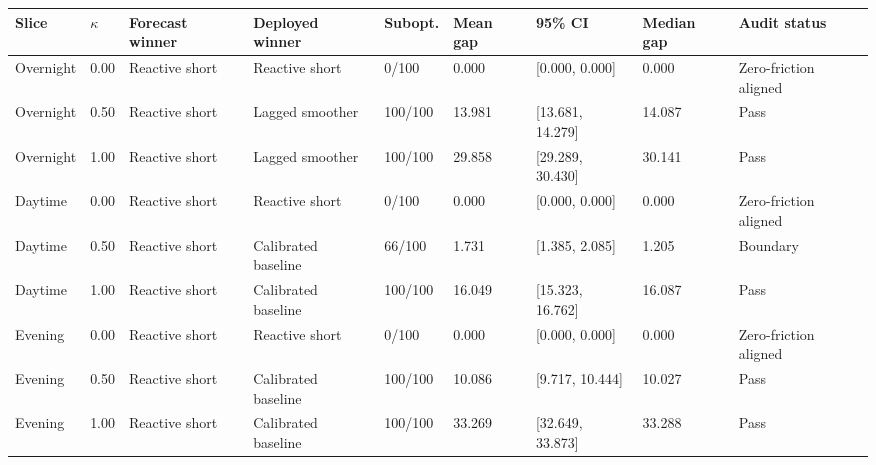 \begin{tabular}{lllllllll}
\toprule
Slice & \(\kappa\) & Forecast winner & Deployed winner & Subopt. & Mean gap & 95\% CI & Median gap & Audit status \\
\midrule
Overnight & 0.00 & Reactive short & Reactive short & 0/100 & 0.000 & [0.000, 0.000] & 0.000 & Zero-friction aligned \\
Overnight & 0.50 & Reactive short & Lagged smoother & 100/100 & 13.981 & [13.681, 14.279] & 14.087 & Pass \\
Overnight & 1.00 & Reactive short & Lagged smoother & 100/100 & 29.858 & [29.289, 30.430] & 30.141 & Pass \\
Daytime & 0.00 & Reactive short & Reactive short & 0/100 & 0.000 & [0.000, 0.000] & 0.000 & Zero-friction aligned \\
Daytime & 0.50 & Reactive short & Calibrated baseline & 66/100 & 1.731 & [1.385, 2.085] & 1.205 & Boundary \\
Daytime & 1.00 & Reactive short & Calibrated baseline & 100/100 & 16.049 & [15.323, 16.762] & 16.087 & Pass \\
Evening & 0.00 & Reactive short & Reactive short & 0/100 & 0.000 & [0.000, 0.000] & 0.000 & Zero-friction aligned \\
Evening & 0.50 & Reactive short & Calibrated baseline & 100/100 & 10.086 & [9.717, 10.444] & 10.027 & Pass \\
Evening & 1.00 & Reactive short & Calibrated baseline & 100/100 & 33.269 & [32.649, 33.873] & 33.288 & Pass \\
\bottomrule
\end{tabular}
